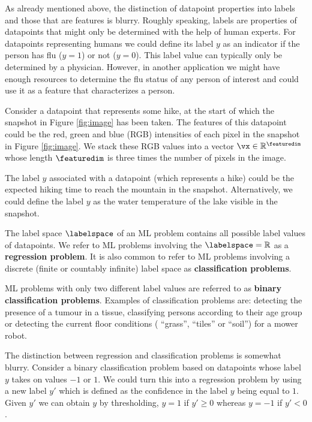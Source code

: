 \documentclass[12pt]{report}
\newcommand{\featurelen}{\featuredim}
\begin{document}
As already mentioned above, the distinction of datapoint properties into 
labels and those that are features is blurry. Roughly speaking, labels are 
properties of datapoints that might only be determined with the help of 
human experts. For datapoints representing humans we could define 
its label $y$ as an indicator if the person has flu ($y=1$) or not ($y=0$). 
This label value can typically only be determined by a physician. However, 
in another application we might have enough resources to determine the 
flu status of any person of interest and could use it as a feature that 
characterizes a person. 

Consider a datapoint that represents some hike, at the 
start of which the snapshot in Figure \ref{fig:image} has
 been taken. The features of this datapoint could be the 
 red, green and blue (RGB) intensities of each pixel in the 
 snapshot in Figure \ref{fig:image}. We stack these RGB 
 values into a vector $\vx \in \mathbb{R}^{\featurelen}$ 
 whose length $\featurelen$ is three times the number 
 of pixels in the image. 
 
 The label $y$ associated with a datapoint (which represents 
 a hike) could be the expected hiking time to reach the mountain in the 
snapshot. Alternatively, we could define the label $y$ as 
the water temperature of the lake visible in the snapshot. 

The label space $\labelspace$ of an ML problem contains all 
possible label values of datapoints. We refer to ML problems involving 
the $\labelspace = \mathbb{R}$ as a {\bf regression problem}. 
It is also common to refer to ML problems involving a discrete 
(finite or countably infinite) label space as {\bf classification problems}. 

ML problems with only two different label values are referred to as 
{\bf binary classification problems}. Examples of classification 
problems are: detecting the presence of a tumour in a tissue, 
classifying persons according to their age group or detecting 
the current floor conditions ( ``grass'', ``tiles'' or ``soil'') for 
a mower robot. 

The distinction between regression and classification problems is 
somewhat blurry. Consider a binary classification problem based 
on datapoints whose label $y$ takes on values $-1$ or $1$. We 
could turn this into a regression problem by using a new label 
$y'$ which is defined as the confidence in the label $y$ being 
equal to $1$. Given $y'$ we can obtain $y$ by thresholding, 
$y=1$ if $y'\geq0$ whereas $y=-1$ if $y' <0$. 
\end{document}
